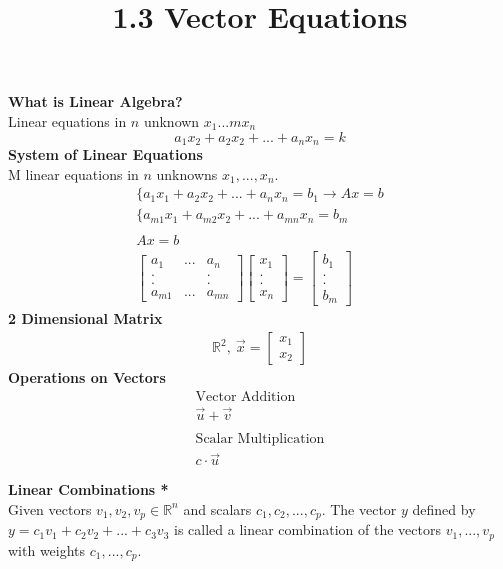 \documentclass{article}
\title{1.3 Vector Equations}
\begin{document}
  \maketitle
  \textbf{What is Linear Algebra?}\\
  Linear equations in $ n $ unknown $ x_{1}...mx_{n}   $
  \[
    a_{1}x_{2}+a_{2}x_{2}+...+a_{n}x_{n}=k      
  \]
  \textbf{System of Linear Equations}\\
  M linear equations in $ n $ unknowns $x_{1},...,x_{n}.$ 
  \[
    \begin{gathered}
    \{a_{1}x_{1}+a_{2}x_{2}+...+a_{n}x_{n}=b_{1}\to Ax=b \\
    \{ a_{m1}x_{1}+a_{m2}x_{2}+...+a_{mn}x_{n}=b_{m}\\
    ~\\ 
      Ax=b\\
      \begin{bmatrix}
        a_{1} &... &a_{n}\\
        . & &.\\
        . & &.\\
        a_{m1} &... &a_{mn}  
      \end{bmatrix}
      \begin{bmatrix}
        x_{1}\\
        .\\
        .\\
        x_{n} 
      \end{bmatrix} = 
      \begin{bmatrix}
        b_{1}\\
        .\\
        .\\
        b_{m} 
      \end{bmatrix}
    \end{gathered}
  \]
  \textbf{2 Dimensional Matrix}
  \[
    \begin{gathered}
      \mathbb{R}^{2},~
      \vec{x}=
      \begin{bmatrix}
        x_{1}\\
        x_{2} 
      \end{bmatrix}
    \end{gathered}
  \]
  \textbf{Operations on Vectors}
  \[
    \begin{gathered}
    \text{Vector Addition}\\
    \vec{u}+\vec{v}\\
    ~\\
    \text{Scalar Multiplication}\\
    c \cdot \vec{u}\\
    ~\\
    \end{gathered}
  \]
    \textbf{Linear Combinations *}\\
    Given vectors $ v_{1},v_{2},v_{p} \in \mathbb{R}^{n}$ and scalars $ c_{1},c_{2},...,c_{p}    $. The vector $ y $ defined by $ y=c_{1}v_{1}+c_{2}v_{2}+...+c_{3}v_{3}$ is called a linear combination of the vectors $ v_{1},...,v_{p}$ with weights $ c_{1},...,c_{p}$.
\end{document}
